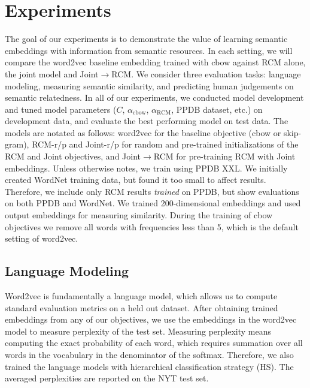 \documentclass[11pt]{article}
\begin{document}

\section{Experiments}
The goal of our experiments is to demonstrate the value of learning semantic embeddings with information from 
semantic resources. In each setting, we will compare the word2vec baseline
embedding trained with cbow against RCM alone, the joint model and Joint$\rightarrow$RCM.
We consider three evaluation tasks:
language modeling, measuring semantic similarity, and predicting human judgements on semantic relatedness.
In all of our experiments, we conducted model development and tuned model parameters ($C$, $\alpha_{\textrm{cbow}}$, 
$\alpha_{\textrm{RCM}}$, PPDB dataset, etc.)
on development data, and evaluate the best performing model on test data.
The models are notated as follows: word2vec for the baseline objective (cbow or skip-gram), RCM-r/p and Joint-r/p for random and pre-trained
initializations of the RCM and Joint objectives, and Joint$\rightarrow$RCM for pre-training RCM with Joint embeddings.
Unless otherwise notes, we train using PPDB XXL.
We initially created WordNet training data, but found it too small to affect results.
Therefore, we include only RCM results {\em trained} on PPDB, but show evaluations on both PPDB and WordNet.
We trained 200-dimensional embeddings and used output embeddings for measuring similarity.
During the training of cbow objectives we remove all words with frequencies less than 5, which is the default setting of word2vec.

\subsection{Language Modeling}
\label{ssec:train_lm}
Word2vec is fundamentally a language model, which allows us to compute standard
evaluation metrics on a held out dataset. After obtaining trained embeddings from any of our objectives,
we use the embeddings in the word2vec model to measure perplexity of the test set.
Measuring perplexity means computing the exact probability of each word, which requires summation over
all words in the vocabulary in the denominator of the softmax. 
Therefore, we also trained the language models with hierarchical classification \cite{mikolov2013distributed} strategy (HS).
The averaged perplexities are reported on the NYT test set.
 
\end{document}
